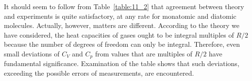 \begin{table}[!b]
	\renewcommand{\arraystretch}{1.2}
	\caption{ }
	\vspace{-0.6cm}
	\label{table:11_2}
	\begin{center}\end{center}
\end{table}

It should seem to follow from Table~\ref{table:11_2} that agreement between theory and experiments is quite satisfactory, at any rate for monatomic and diatomic molecules. Actually, however, matters are different. According to the theory we have considered, the heat capacities of gases ought to be integral multiples of $R/2$ because the number of degrees of freedom can only be integral. Therefore, even small deviations of $C_V$ and $C_p$ from values that are multiples of $R/2$ have fundamental significance. Examination of the table shows that such deviations, exceeding the possible errors of measurements, are encountered.

